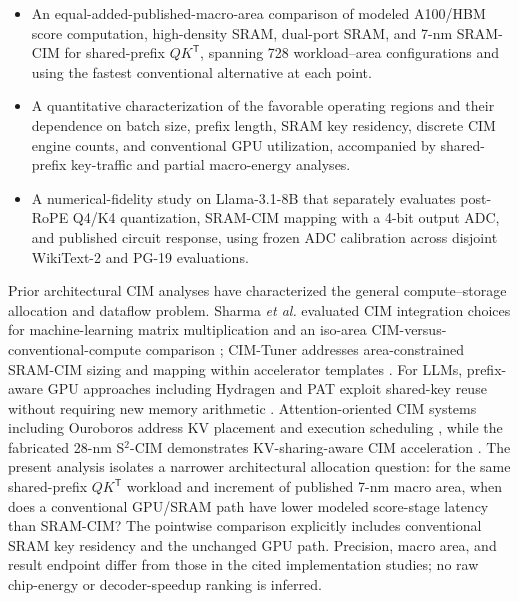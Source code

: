 \begin{itemize}
\item An equal-added-published-macro-area comparison of modeled A100/HBM score computation, high-density SRAM, dual-port SRAM, and 7-nm SRAM-CIM for shared-prefix $QK^{\mathsf T}$, spanning 728 workload--area configurations and using the fastest conventional alternative at each point.
\item A quantitative characterization of the favorable operating regions and their dependence on batch size, prefix length, SRAM key residency, discrete CIM engine counts, and conventional GPU utilization, accompanied by shared-prefix key-traffic and partial macro-energy analyses.
\item A numerical-fidelity study on Llama-3.1-8B that separately evaluates post-RoPE Q4/K4 quantization, SRAM-CIM mapping with a 4-bit output ADC, and published circuit response, using frozen ADC calibration across disjoint WikiText-2 and PG-19 evaluations.
\end{itemize}

Prior architectural CIM analyses have characterized the general compute--storage allocation and dataflow problem. Sharma \emph{et al.} evaluated CIM integration choices for machine-learning matrix multiplication \cite{Sharma2025WhatWhenWhere} and an iso-area CIM-versus-conventional-compute comparison \cite{Sharma2025Dataflow}; CIM-Tuner addresses area-constrained SRAM-CIM sizing and mapping within accelerator templates \cite{EXISTING_CIM_TUNER}. For LLMs, prefix-aware GPU approaches including Hydragen and PAT exploit shared-key reuse without requiring new memory arithmetic \cite{EXISTING_HYDRAGEN,EXISTING_PAT}. Attention-oriented CIM systems including Ouroboros address KV placement and execution scheduling \cite{EXISTING_OUROBOROS}, while the fabricated 28-nm S$^2$-CIM demonstrates KV-sharing-aware CIM acceleration \cite{Liu2026S2CIM}. The present analysis isolates a narrower architectural allocation question: for the same shared-prefix $QK^{\mathsf T}$ workload and increment of published 7-nm macro area, when does a conventional GPU/SRAM path have lower modeled score-stage latency than SRAM-CIM? The pointwise comparison explicitly includes conventional SRAM key residency and the unchanged GPU path. Precision, macro area, and result endpoint differ from those in the cited implementation studies; no raw chip-energy or decoder-speedup ranking is inferred.

